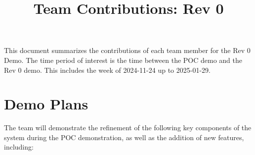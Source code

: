 \documentclass{article}
\title{Team Contributions: Rev 0\\\progname}
\author{\authname}
\date{}
\begin{document}
\maketitle

This document summarizes the contributions of each team member for the Rev 0
Demo.  The time period of interest is the time between the POC demo and the Rev
0 demo. This includes the week of 2024-11-24 up to 2025-01-29.

\newpage
\section{Demo Plans}

\noindent The team will demonstrate the refinement of the following key components of the system during the POC demonstration, as well as the addition of new features, including: 
\end{document}
